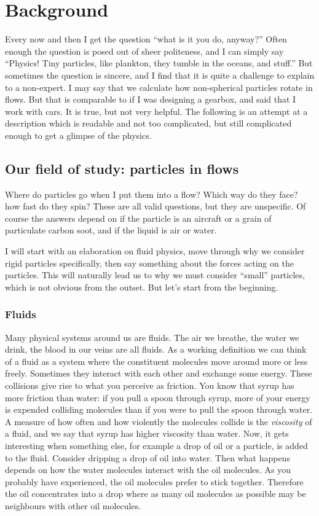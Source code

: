 \documentclass[thesis.tex]{subfiles}
\begin{document}
\chapter{Background}\label{sec:background}

 Every now and then I get the question ``what is it you do, anyway?'' Often enough the question is posed out of sheer politeness, and I can simply say ``Physics! Tiny particles, like plankton, they tumble in the oceans, and stuff.'' But sometimes the question is sincere, and I find that it is quite a challenge to explain to a non-expert. I may say that we calculate how non-spherical particles rotate in flows. But that is comparable to if I was designing a gearbox, and said that I work with cars. It is true, but not very helpful. The following is an attempt at a description which is readable and not too complicated, but still complicated enough to get a glimpse of the physics.


\section{Our field of study: particles in flows}\label{sec:context}

Where do particles go when I put them into a flow? Which way do they face? how fast do they spin? These are all valid questions, but they are unspecific. Of course the answers depend on if the particle is an aircraft or a grain of particulate carbon soot, and if the liquid is air or water. 

I will start with an elaboration on fluid physics, move through why we consider rigid particles specifically, then say something about the forces acting on the particles. This will naturally lead us to why we must consider ``small'' particles, which is not obvious from the outset. But let's start from the beginning.

\subsection*{Fluids}

Many physical systems around us are fluids. The air we breathe, the water we drink, the blood in our veins are all fluids. As a working definition we can think of a fluid as a system where the constituent molecules move around more or less freely. Sometimes they interact with each other and exchange some energy. These collisions give rise to what you perceive as friction. You know that syrup has more friction than water: if you pull a spoon through syrup, more of your energy is expended colliding molecules than if you were to pull the spoon through water. A measure of how often and how violently the molecules collide is the \emph{viscosity} of a fluid, and we say that syrup has higher viscosity than water. Now, it gets interesting when something else, for example a drop of oil or a particle, is added to the fluid. Consider dripping a drop of oil into water. Then what happens depends on how the water molecules interact with the oil molecules. As you probably have experienced, the oil molecules prefer to stick together. Therefore the oil concentrates into a drop where as many oil molecules as possible may be neighbours with other oil molecules.
\end{document}
